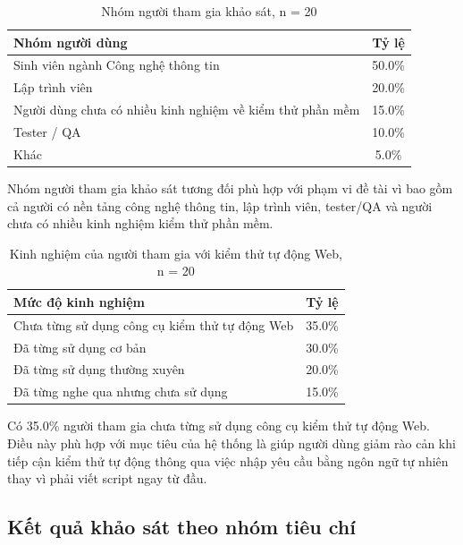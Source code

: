\begin{table}[H]
\centering
\caption{Nhóm người tham gia khảo sát, n = 20}
\label{tab:chapter6_survey_participants}
\renewcommand{\arraystretch}{1.2}
\begin{tabular}{|p{10.0cm}|c|}
\hline
\textbf{Nhóm người dùng} & \textbf{Tỷ lệ} \\
\hline
Sinh viên ngành Công nghệ thông tin & 50.0\% \\
\hline
Lập trình viên & 20.0\% \\
\hline
Người dùng chưa có nhiều kinh nghiệm về kiểm thử phần mềm & 15.0\% \\
\hline
Tester / QA & 10.0\% \\
\hline
Khác & 5.0\% \\
\hline
\end{tabular}
\end{table}

Nhóm người tham gia khảo sát tương đối phù hợp với phạm vi đề tài vì bao gồm cả người có nền tảng công nghệ thông tin, lập trình viên, tester/QA và người chưa có nhiều kinh nghiệm kiểm thử phần mềm.

\begin{table}[H]
\centering
\caption{Kinh nghiệm của người tham gia với kiểm thử tự động Web, n = 20}
\label{tab:chapter6_survey_experience}
\renewcommand{\arraystretch}{1.2}
\begin{tabular}{|p{10.0cm}|c|}
\hline
\textbf{Mức độ kinh nghiệm} & \textbf{Tỷ lệ} \\
\hline
Chưa từng sử dụng công cụ kiểm thử tự động Web & 35.0\% \\
\hline
Đã từng sử dụng cơ bản & 30.0\% \\
\hline
Đã từng sử dụng thường xuyên & 20.0\% \\
\hline
Đã từng nghe qua nhưng chưa sử dụng & 15.0\% \\
\hline
\end{tabular}
\end{table}

Có 35.0\% người tham gia chưa từng sử dụng công cụ kiểm thử tự động Web. Điều này phù hợp với mục tiêu của hệ thống là giúp người dùng giảm rào cản khi tiếp cận kiểm thử tự động thông qua việc nhập yêu cầu bằng ngôn ngữ tự nhiên thay vì phải viết script ngay từ đầu.

\subsection{Kết quả khảo sát theo nhóm tiêu chí}

